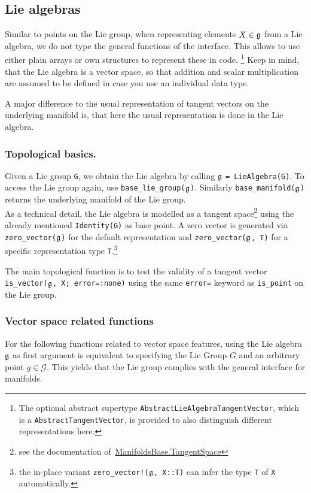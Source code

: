 \documentclass{juliacon}
\begin{document}
\subsection{Lie algebras}

Similar to points on the Lie group, when representing elements $X \in \frak g$ from a Lie algebra, we do not type the general functions of the interface.
This allows to use either plain arrays or own structures to represent these in code.
\footnote{The optional abstract supertype \texttt{AbstractLieAlgebraTangentVector}, which is a \texttt{AbstractTangentVector}, is provided to also distinguish different representations here.}
Keep in mind, that the Lie algebra is a vector space, so that addition and scalar multiplication are assumed to be defined in case you use an individual data type.

A major difference to the usual representation of tangent vectors on the underlying manifold is, that here the usual representation is done in the Lie algebra.

\subsubsection*{Topological basics.}
Given a Lie group \verb|G|, we obtain the Lie algebra by calling $\frak g$ \verb|= LieAlgebra(G)|.
To access the Lie group again, use \verb|base_lie_group(|$\frak g$\verb|)|. Similarly \verb|base_manifold(|$\frak g$\verb|)| returns the underlying manifold of the Lie group.\\
As a technical detail, the Lie algebra is modelled as a tangent space\footnote{see the documentation of~\href{https://juliamanifolds.github.io/ManifoldsBase.jl/stable/metamanifolds/\#ManifoldsBase.TangentSpace}{ManifoldsBase.TangentSpace}} using the already mentioned \verb|Identity(G)| as base point.
A zero vector is generated via \verb|zero_vector(|$\frak g$\verb|)| for the default representation and \verb|zero_vector(|$\frak g$\verb|, T)| for a specific representation type \verb|T|.\footnote{the in-place variant \texttt{zero\_vector!($\frak g$, X::T)} can infer the type \texttt{T} of \texttt{X} automatically.}

The main topological function is to test the validity of a tangent vector \verb|is_vector(|$\frak g$\verb|, X; error=:none)| using the same \verb|error=| keyword as \verb|is_point| on the Lie group.

\subsubsection*{Vector space related functions}
For the following functions related to vector space features, using the Lie algebra $\frak g$ as first argument is equivalent to specifying the Lie Group $G$ and an arbitrary point $g \in \mathcal G$. This yields that the Lie group complies with the general interface for manifolds.
\end{document}
